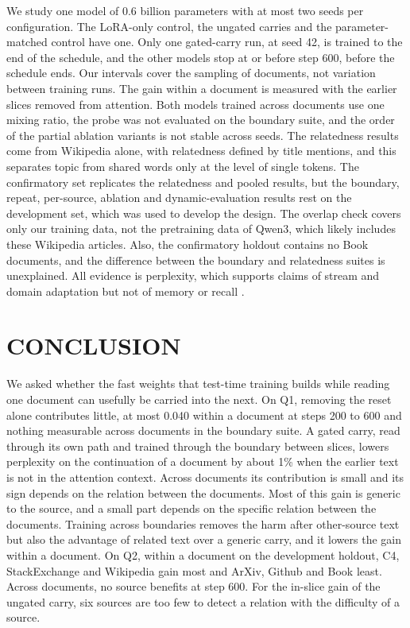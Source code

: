 \documentclass[12pt,a4paper]{report}
\begin{document}
We study one model of 0.6 billion parameters with at most two seeds per configuration. The LoRA-only control, the ungated carries and the parameter-matched control have one. Only one gated-carry run, at seed 42, is trained to the end of the schedule, and the other models stop at or before step 600, before the schedule ends. Our intervals cover the sampling of documents, not variation between training runs. The gain within a document is measured with the earlier slices removed from attention. Both models trained across documents use one mixing ratio, the probe was not evaluated on the boundary suite, and the order of the partial ablation variants is not stable across seeds. The relatedness results come from Wikipedia alone, with relatedness defined by title mentions, and this separates topic from shared words only at the level of single tokens. The confirmatory set replicates the relatedness and pooled results, but the boundary, repeat, per-source, ablation and dynamic-evaluation results rest on the development set, which was used to develop the design. The overlap check covers only our training data, not the pretraining data of Qwen3, which likely includes these Wikipedia articles. Also, the confirmatory holdout contains no Book documents, and the difference between the boundary and relatedness suites is unexplained. All evidence is perplexity, which supports claims of stream and domain adaptation but not of memory or recall \citep{song2026beyond}.

\chapter{CONCLUSION}

We asked whether the fast weights that test-time training builds while reading one document can usefully be carried into the next. On Q1, removing the reset alone contributes little, at most 0.040 within a document at steps 200 to 600 and nothing measurable across documents in the boundary suite. A gated carry, read through its own path and trained through the boundary between slices, lowers perplexity on the continuation of a document by about 1\% when the earlier text is not in the attention context. Across documents its contribution is small and its sign depends on the relation between the documents. Most of this gain is generic to the source, and a small part depends on the specific relation between the documents. Training across boundaries removes the harm after other-source text but also the advantage of related text over a generic carry, and it lowers the gain within a document. On Q2, within a document on the development holdout, C4, StackExchange and Wikipedia gain most and ArXiv, Github and Book least. Across documents, no source benefits at step 600. For the in-slice gain of the ungated carry, six sources are too few to detect a relation with the difficulty of a source.
\end{document}
